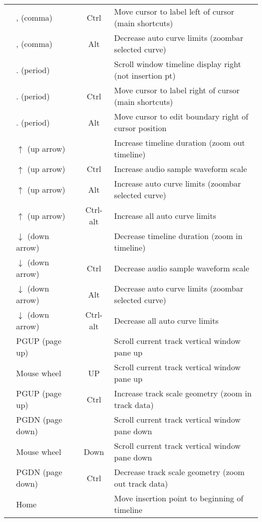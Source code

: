 \begin{center}
\begin{longtable}{ >{\bfseries}c l c p{6cm}}
        & , (comma) & Ctrl & Move cursor to label left of cursor (main shortcuts) \\        
        & , (comma) & Alt & Decrease auto curve limits (zoombar selected curve) \\        
        & . (period) &  & Scroll window timeline display right (not insertion pt) \\        
        & . (period) & Ctrl & Move cursor to label right of cursor (main shortcuts) \\        
        & . (period) & Alt & Move cursor to edit boundary right of cursor position \\        
        & $\uparrow$ (up arrow) &  & Increase timeline duration (zoom out timeline) \\        
        & $\uparrow$ (up arrow) & Ctrl & Increase audio sample waveform scale \\        
        & $\uparrow$ (up arrow) & Alt & Increase auto curve limits (zoombar selected curve) \\        
        & $\uparrow$ (up arrow) & Ctrl-alt & Increase all auto curve limits \\        
        & $\downarrow$ (down arrow) &  & Decrease timeline duration (zoom in timeline) \\        
        & $\downarrow$ (down arrow) & Ctrl & Decrease audio sample waveform scale \\        
        & $\downarrow$ (down arrow) & Alt & Decrease auto curve limits (zoombar selected curve) \\        
        & $\downarrow$ (down arrow) & Ctrl-alt & Decrease all auto curve limits \\        
        & PGUP (page up) &  & Scroll current track vertical window pane up \\        
        & Mouse wheel & UP & Scroll current track vertical window pane up \\        
        & PGUP (page up) & Ctrl & Increase track scale geometry (zoom in track data) \\        
        & PGDN (page down) &  & Scroll current track vertical window pane down \\        
        & Mouse wheel & Down & Scroll current track vertical window pane down \\        
        & PGDN (page down) & Ctrl & Decrease track scale geometry (zoom out track data) \\        
        & Home &  & Move insertion point to beginning of timeline \\        

\end{longtable}
\end{center}
